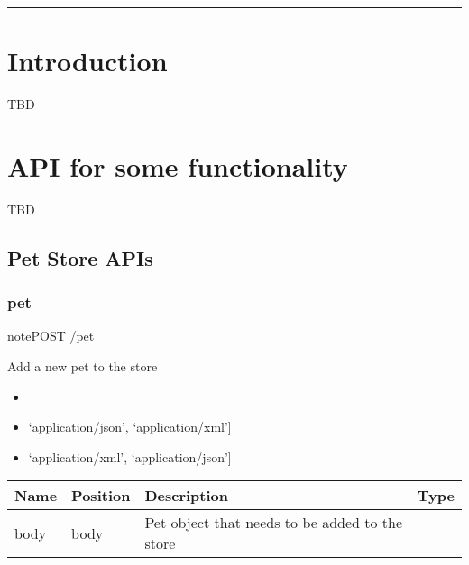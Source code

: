 \documentclass[letterpaper,10pt,english]{sphinxmanual}
\begin{document}
\bigskip\hrule\bigskip



\chapter{Introduction}
\label{\detokenize{dev-guide:introduction}}
TBD


\chapter{API for some functionality}
\label{\detokenize{dev-guide:api-for-some-functionality}}
TBD


\section{Pet Store APIs}
\label{\detokenize{dev-guide:pet-store-apis}}

\subsection{pet}
\label{\detokenize{dev-guide:pet}}
\begin{sphinxadmonition}{note}{POST /pet}

Add a new pet to the store\begin{itemize}
\item {} 

\item {} 
\sphinxstylestrong{Consumes: 
}{[}‘application/json’, ‘application/xml’{]}

\item {} 
\sphinxstylestrong{Produces: 
}{[}‘application/xml’, ‘application/json’{]}

\end{itemize}




\begin{savenotes}\sphinxattablestart
\centering
\begin{tabulary}{\linewidth}[t]{|T|T|T|T|}
\hline
\sphinxstyletheadfamily 
Name
&\sphinxstyletheadfamily 
Position
&\sphinxstyletheadfamily 
Description
&\sphinxstyletheadfamily 
Type
\\
\hline
body
&
body
&
Pet object that needs to be added to the store
&

\\
\hline
\end{tabulary}
\par
\sphinxattableend\end{savenotes}


\end{sphinxadmonition}
\end{document}
